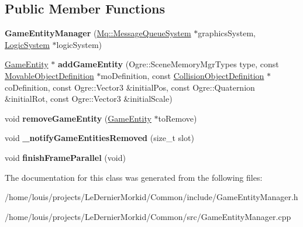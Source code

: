 \subsection*{Public Member Functions}
\begin{DoxyCompactItemize}
\item 
\mbox{\label{class_common_1_1_game_entity_manager_abd796010d78cf6d9b6b6f8f7eddbba89}} 
{\bfseries Game\+Entity\+Manager} (\hyperlink{class_common_1_1_mq_1_1_message_queue_system}{Mq\+::\+Message\+Queue\+System} $\ast$graphics\+System, \hyperlink{class_common_1_1_logic_system}{Logic\+System} $\ast$logic\+System)
\item 
\mbox{\label{class_common_1_1_game_entity_manager_a982abe1d421f8a59fb1ca21ebca97b5f}} 
\hyperlink{struct_common_1_1_game_entity}{Game\+Entity} $\ast$ {\bfseries add\+Game\+Entity} (Ogre\+::\+Scene\+Memory\+Mgr\+Types type, const \hyperlink{struct_common_1_1_movable_object_definition}{Movable\+Object\+Definition} $\ast$mo\+Definition, const \hyperlink{struct_common_1_1_collision_object_definition}{Collision\+Object\+Definition} $\ast$co\+Definition, const Ogre\+::\+Vector3 \&initial\+Pos, const Ogre\+::\+Quaternion \&initial\+Rot, const Ogre\+::\+Vector3 \&initial\+Scale)
\item 
\mbox{\label{class_common_1_1_game_entity_manager_ab08fbd68fbafbf170abe71f7815b7a13}} 
void {\bfseries remove\+Game\+Entity} (\hyperlink{struct_common_1_1_game_entity}{Game\+Entity} $\ast$to\+Remove)
\item 
\mbox{\label{class_common_1_1_game_entity_manager_ac1cb3aaa00139aaaca96a96e391fa2dc}} 
void {\bfseries \+\_\+notify\+Game\+Entities\+Removed} (size\+\_\+t slot)
\item 
\mbox{\label{class_common_1_1_game_entity_manager_a3f8cae1b23e5f53152c1af65b250dcdd}} 
void {\bfseries finish\+Frame\+Parallel} (void)
\end{DoxyCompactItemize}


The documentation for this class was generated from the following files\+:\begin{DoxyCompactItemize}
\item 
/home/louis/projects/\+Le\+Dernier\+Morkid/\+Common/include/Game\+Entity\+Manager.\+h\item 
/home/louis/projects/\+Le\+Dernier\+Morkid/\+Common/src/Game\+Entity\+Manager.\+cpp\end{DoxyCompactItemize}

